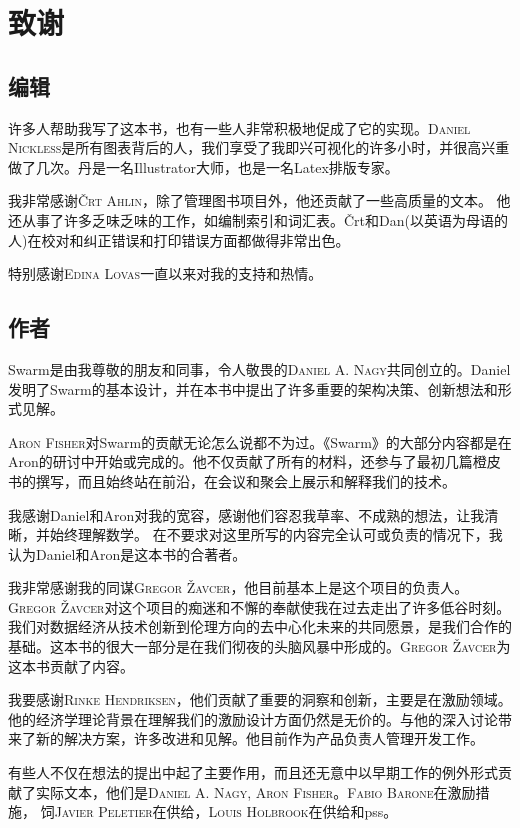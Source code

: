 \newcommand{\person}[1]{{\scshape #1}}
\chapter{致谢\statusgreen}

\section*{编辑}

许多人帮助我写了这本书，也有一些人非常积极地促成了它的实现。\person{Daniel Nickless}是所有图表背后的人，我们享受了我即兴可视化的许多小时，并很高兴重做了几次。丹是一名Illustrator大师，也是一名Latex排版专家。 

我非常感谢\person{Črt Ahlin}，除了管理图书项目外，他还贡献了一些高质量的文本。
他还从事了许多乏味乏味的工作，如编制索引和词汇表。Črt和Dan(以英语为母语的人)在校对和纠正错误和打印错误方面都做得非常出色。

特别感谢\person{Edina Lovas}一直以来对我的支持和热情。 

\section*{作者}

Swarm是由我尊敬的朋友和同事，令人敬畏的\person{Daniel A. Nagy}共同创立的。Daniel发明了Swarm的基本设计，并在本书中提出了许多重要的架构决策、创新想法和形式见解。 

\person{Aron Fisher}对Swarm的贡献无论怎么说都不为过。《Swarm》的大部分内容都是在Aron的研讨中开始或完成的。他不仅贡献了所有的材料，还参与了最初几篇橙皮书的撰写，而且始终站在前沿，在会议和聚会上展示和解释我们的技术。

我感谢Daniel和Aron对我的宽容，感谢他们容忍我草率、不成熟的想法，让我清晰，并始终理解数学。
在不要求对这里所写的内容完全认可或负责的情况下，我认为Daniel和Aron是这本书的合著者。

我非常感谢我的同谋\person{Gregor Žavcer}，他目前基本上是这个项目的负责人。\person{Gregor Žavcer}对这个项目的痴迷和不懈的奉献使我在过去走出了许多低谷时刻。我们对数据经济从技术创新到伦理方向的去中心化未来的共同愿景，是我们合作的基础。这本书的很大一部分是在我们彻夜的头脑风暴中形成的。\person{Gregor Žavcer}为这本书贡献了内容。

我要感谢\person{Rinke Hendriksen}，他们贡献了重要的洞察和创新，主要是在激励领域。他的经济学理论背景在理解我们的激励设计方面仍然是无价的。与他的深入讨论带来了新的解决方案，许多改进和见解。他目前作为产品负责人管理开发工作。

有些人不仅在想法的提出中起了主要作用，而且还无意中以早期工作的例外形式贡献了实际文本，他们是\person{Daniel A. Nagy}, \person{Aron Fisher}。\person{Fabio Barone}在激励措施，  
饲\person{Javier Peletier}在供给，\person{Louis Holbrook}在供给和pss。 

